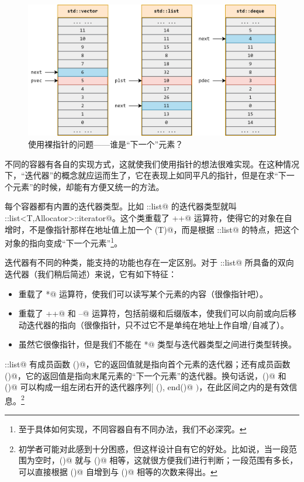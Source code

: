 \begin{figure}[htbp]
    \centering
    \includegraphics[width=\textwidth]{../images/generalized_parts/11_different_types_of_pointer_to_containers.drawio.png}
    \caption{使用裸指针的问题——谁是``下一个''元素？}
\end{figure}
不同的容器有各自的实现方式，这就使我们使用指针的想法很难实现。在这种情况下，``迭代器''的概念就应运而生了，它在表现上如同平凡的指针，但是在求``下一个元素''的时候，却能有方便又统一的方法。\par
每个容器都有内置的迭代器类型。比如 \lstinline@std::list@ 的迭代器类型就叫 \lstinline@std::list<T,Allocator>::iterator@。这个类重载了 \lstinline@++@ 运算符，使得它的对象在自增时，不是像指针那样在地址值上加一个 \lstinline@sizeof(T)@，而是根据 \lstinline@std::list@ 的特点，把这个对象的指向变成``下一个元素''\footnote{至于具体如何实现，不同容器自有不同办法，我们不必深究。}。\par
迭代器有不同的种类，能支持的功能也存在一定区别。对于 \lstinline@std::list@ 所具备的双向迭代器（我们稍后简述）来说，它有如下特征：
\begin{itemize}
    \item 重载了 \lstinline@*@ 运算符，使我们可以读写某个元素的内容（很像指针吧）。
    \item 重载了 \lstinline@++@ 和 \lstinline@--@ 运算符，包括前缀和后缀版本，使我们可以向前或向后移动迭代器的指向（很像指针，只不过它不是单纯在地址上作自增/自减了）。
    \item 虽然它很像指针，但是我们不能在 \lstinline@T*@ 类型与迭代器类型之间进行类型转换。
\end{itemize}\par
\lstinline@std::list@ 有成员函数 \lstinline@begin()@，它的返回值就是指向首个元素的迭代器；还有成员函数 \lstinline@end()@，它的返回值是指向末尾元素的``下一个元素''的迭代器。换句话说，\lstinline@begin()@ 和 \lstinline@end()@ 可以构成一组左闭右开的迭代器序列$[$ \lstinline@begin(), end()@ $)$，在此区间之内的是有效信息。\footnote{初学者可能对此感到十分困惑，但这样设计自有它的好处。比如说，当一段范围为空时，\lstinline@begin()@ 就与 \lstinline@end()@ 相等，这就很方便我们进行判断；一段范围有多长，可以直接根据 \lstinline@begin()@ 自增到与 \lstinline@end()@ 相等的次数来得出。}\par
